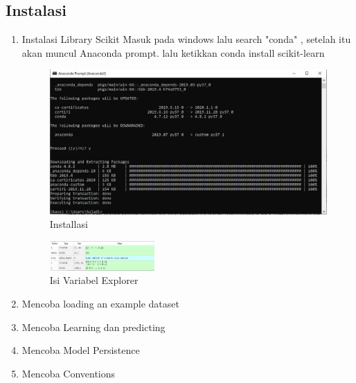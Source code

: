 \subsection{Instalasi}
\begin{enumerate}
\item {Instalasi Library Scikit}
Masuk pada windows lalu search "conda" , setelah itu akan muncul Anaconda prompt. lalu ketikkan conda install scikit-learn
\begin{figure}[ht]
\centering
\includegraphics[scale=0.5]{figures/1174051/1/1.JPG}
\caption{Installasi}
\label{contoh}
\end{figure}
\begin{figure}[H]
\centering
\includegraphics[width=4cm]{figures/1174051/1/2.JPG}
\caption{Isi Variabel Explorer}
\end{figure}
\item Mencoba loading an example dataset
\hfill\break

\item Mencoba Learning dan predicting
\hfill\break

\item Mencoba Model Persistence
\hfill\break

\item Mencoba Conventions
\hfill\break

\end{enumerate}
